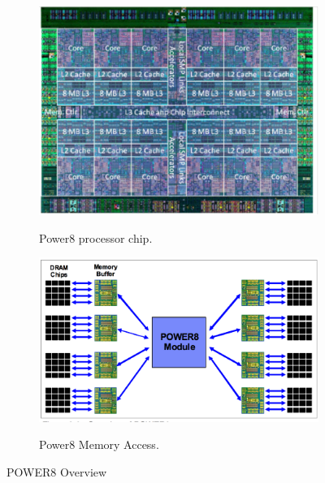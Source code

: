 \begin{figure}
    \centering
    \begin{subfigure}[b]{0.4\textwidth}
         {\includegraphics[width=1.0\textwidth]{./Images/P8.pdf}}
	 \caption{Power8 processor chip.~\cite{IBM_P8}}
 	 \label{fig:p8_1}
    \end{subfigure}
     \centering
    \begin{subfigure}[b]{0.4\textwidth}
         {\includegraphics[height=0.7\textwidth]{./Images/P8_memory.pdf}}
	 \caption{Power8 Memory Access.~\cite{IBM_P8}}
	  \label{fig:p8_2}
    \end{subfigure}
  \caption{POWER8 Overview}\label{fig:POWER8}
\end{figure}







 